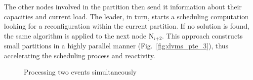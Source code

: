The other nodes involved in the partition then send it information about their
capacities and current load. The leader, in turn, starts a scheduling
computation looking for a reconfiguration within the current
partition. If no solution is found, the same algorithm is applied to
the next node N\(_{\textit{i+2}}\).
%
This approach constructs small partitions in a highly parallel manner
(Fig.~\ref{fig:dvms_pte_3}), thus accelerating the scheduling process
and reactivity.

\begin{figure}[hbp]
\vspace*{-.4cm}
%
%
%
%
\vspace*{-.4cm}
\caption{Processing two events simultaneously\label{fig:dvms_pte}}
\vspace*{-1cm}
\end{figure}

